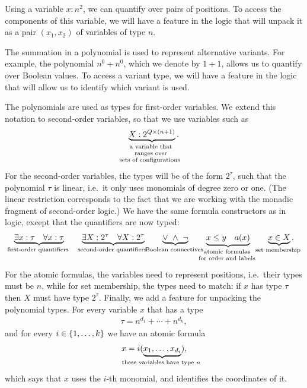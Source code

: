 \begin{myexample}
    Using a variable $x : n^2$, we  can quantify over pairs of positions.
    To access the components of this variable, we will have a feature in the logic that will unpack it as a pair $(x_1,x_2)$ of variables of type $n$. 
\end{myexample}

\begin{myexample} The summation in a polynomial is used to represent alternative variants. For example, the polynomial $n^0 + n^0$, which we denote by $1+1$, allows us to quantify over Boolean values. To access a variant type, we will have a feature in the logic that will allow us to identify which variant is used.
\end{myexample}

The polynomials are used as types for first-order variables. We extend this notation to second-order variables, so that we use variables such as
\begin{align*}
\myunderbrace{ X : 2^{ Q \times (n+1)}}{a variable that \\ ranges over \\ sets of configurations }.
\end{align*}
For the second-order variables, the types will be of the form $2^\tau$, such that the polynomial $\tau$ is linear, i.e.~it only uses monomials of degree zero or one. (The linear restriction  corresponds to the fact that we are working with the monadic fragment of  second-order logic.) 
 We have the same formula constructors as in \mso logic, except that the quantifiers are now typed:
\begin{align*}
\myunderbrace{\exists x : \tau \quad \forall x : \tau}{first-order quantifiers}
\qquad 
\myunderbrace{\exists X : 2^\tau \quad \forall X : 2^\tau}{second-order quantifiers}
\qquad 
\myunderbrace{\lor \ \land \  \neg}{Boolean connectives}
\qquad 
\myunderbrace{x \le y \quad a(x)}{atomic formulas \\ for order and labels} 
\qquad 
\myunderbrace{x \in X}{set membership}.
\end{align*}
For the atomic formulas, the variables need to represent positions, i.e.~their types must be $n$, while for set membership, the types need to match: if $x$ has type $\tau$ then $X$ must have type $2^\tau$.  Finally, we add a feature for  unpacking the polynomial types. For every variable $x$ that has a type 
\begin{align*}
\tau = n^{d_1} + \cdots + n^{d_k},
\end{align*}
and for every $i \in \{1,\ldots,k\}$ we have an atomic formula
\begin{align*}
x = i(\myunderbrace{x_1,\ldots,x_{d_i}}{these variables have type $n$}),
\end{align*}
which says that $x$    uses the $i$-th monomial, and identifies the coordinates of it. 

